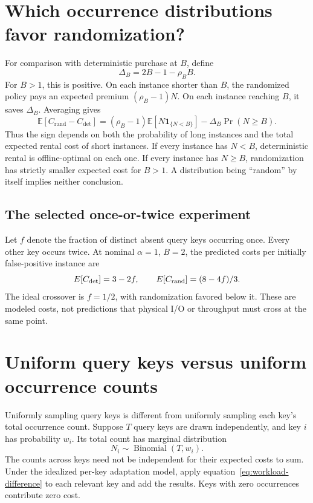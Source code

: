 \documentclass[11pt]{article}
\begin{document}
\section{Which occurrence distributions favor randomization?}
For comparison with deterministic purchase at $B$, define
\[
\Delta_B=2B-1-\rho_BB.
\]
For $B>1$, this is positive. On each instance shorter than $B$, the randomized policy pays an expected premium $(\rho_B-1)N$. On each instance reaching $B$, it saves $\Delta_B$. Averaging gives
\begin{equation}
\mathbb E[C_{\mathrm{rand}}-C_{\mathrm{det}}]
=(\rho_B-1)\mathbb E[N\mathbf1_{\{N<B\}}]
-\Delta_B\Pr(N\ge B).
\label{eq:workload-difference}
\end{equation}
Thus the sign depends on both the probability of long instances and the total expected rental cost of short instances. If every instance has $N<B$, deterministic rental is offline-optimal on each one. If every instance has $N\ge B$, randomization has strictly smaller expected cost for $B>1$. A distribution being ``random'' by itself implies neither conclusion.

\subsection{The selected once-or-twice experiment}
Let $f$ denote the fraction of distinct absent query keys occurring once. Every other key occurs twice. At nominal $\alpha=1$, $B=2$, the predicted costs per initially false-positive instance are
\[
E[C_{\rm det}]=3-2f,\qquad E[C_{\rm rand}]=(8-4f)/3.
\]
The ideal crossover is $f=1/2$, with randomization favored below it. These are modeled costs, not predictions that physical I/O or throughput must cross at the same point.

\section{Uniform query keys versus uniform occurrence counts}
Uniformly sampling query keys is different from uniformly sampling each key's total occurrence count. Suppose $T$ query keys are drawn independently, and key $i$ has probability $w_i$. Its total count has marginal distribution
\[
N_i\sim\operatorname{Binomial}(T,w_i).
\]
The counts across keys need not be independent for their expected costs to sum. Under the idealized per-key adaptation model, apply equation~\eqref{eq:workload-difference} to each relevant key and add the results. Keys with zero occurrences contribute zero cost.
\end{document}
